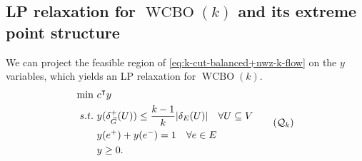 \documentclass[11pt]{article}
\begin{document}
\subsection{LP relaxation for $\operatorname{WCBO}(k)$ and its extreme point structure}\label{sec:WCBO-LP}
We can project the feasible region of \eqref{eq:k-cut-balanced+nwz-k-flow} on the $y$ variables, which yields an LP relaxation for $\operatorname{WCBO}(k)$.
\begin{equation}\label{eq:k-cut_balanced}
\begin{aligned}
    \min~&c^\intercal y\\
    s.t.~&y(\delta_{\vec{G}}^+(U))\leq \frac{k-1}{k}|\delta_E(U)|\quad \forall U\subseteq V\\
    &y(e^+)+y(e^-)=1\quad \forall e\in E\\
        &y\geq 0.
\end{aligned}\tag{$\mathcal{Q}_k$}
\end{equation}
\end{document}
